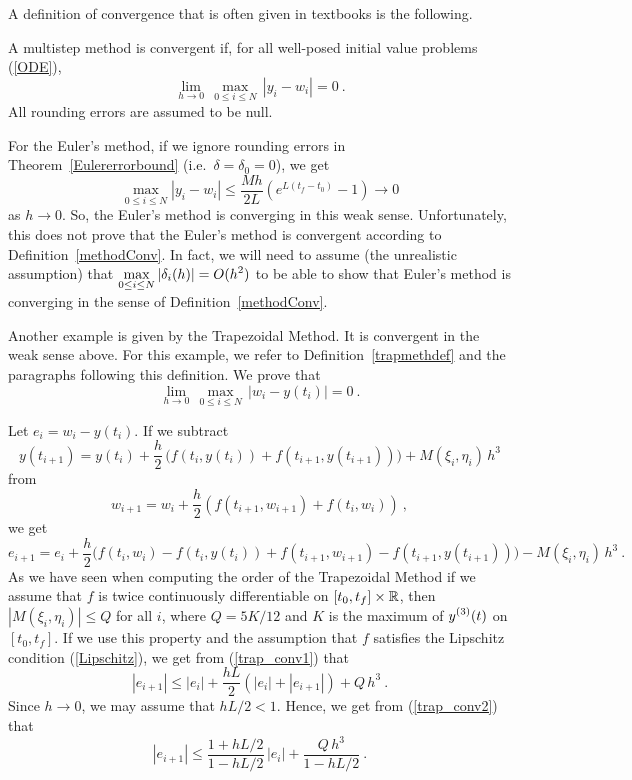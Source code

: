 \begin{rmk}
A definition of convergence that is often given in textbooks is the
following.  \label{AltDefConv}

A multistep method is convergent if, for all
well-posed initial value problems (\ref{ODE}),
\[
\lim_{h \rightarrow 0}\,\max_{0\leq i \leq N} \,|y_i - w_i| = 0 \ .
\]
All rounding errors are assumed to be null.

For the Euler's method, if we ignore rounding errors
in Theorem~\ref{Eulererrorbound} (i.e.\ $\delta=\delta_0=0$), we get
\[
\max_{0\leq i \leq N} |y_i - w_i| \leq
\frac{Mh}{2L}\left(e^{L(t_f -t_0)} -1 \right) \rightarrow 0
\]
as $h \rightarrow 0$.  So, the Euler's method is
converging in this weak sense.  Unfortunately, this does not
prove that the Euler's method is convergent according to
Definition~\ref{methodConv}.  In fact, we will need to assume
(the unrealistic assumption) that
$\displaystyle \max_{0\leq i \leq N} |\delta_i(h)| = O(h^2)$ to be
able to show that Euler's method is converging in the sense of
Definition~\ref{methodConv}.

Another example is given by the Trapezoidal Method.  It is convergent in
the weak sense above.  For this example, we refer to
Definition~\ref{trapmethdef} and the paragraphs following this
definition.  We prove that
\begin{equation} \label{trap_conv0}
\lim_{h\rightarrow 0}\,\max_{0\leq i \leq N}\,|w_i-y(t_i)| = 0 \ .
\end{equation}

Let $e_i = w_i - y(t_i)$.  If we subtract
\[
y(t_{i+1}) = y(t_i) + \frac{h}{2}\,\big(
f(t_i,y(t_i)) + f(t_{i+1},y(t_{i+1})) \big) + M(\xi_i,\eta_i)\,h^3
\]
from
\[
w_{i+1} = w_i + \frac{h}{2} \left(f(t_{i+1},w_{i+1}) +f(t_i,w_i) \right) \ ,
\]
we get
\begin{equation} \label{trap_conv1}
e_{i+1} = e_i + \frac{h}{2}\bigg( f(t_i,w_i) -
f(t_i,y(t_i)) + f(t_{i+1},w_{i+1}) - f(t_{i+1},y(t_{i+1})) \bigg)
- M(\xi_i,\eta_i)\,h^3 \ .
\end{equation}
As we have seen when computing the order of the Trapezoidal Method
if we assume that $f$ is twice continuously differentiable on
$[t_0,t_f]\times\mathbb{R}$, then $| M(\xi_i, \eta_i)| \leq Q$ for all $i$, where
$Q = 5K/12$ and $K$ is the maximum of $\displaystyle y^{(3)}(t)$ on $[t_0,t_f]$.
If we use this property and the assumption that $f$ satisfies the
Lipschitz condition (\ref{Lipschitz}), we get from (\ref{trap_conv1}) that
\begin{equation} \label{trap_conv2}
|e_{i+1}| \leq |e_i| + \frac{hL}{2}\left( |e_i| + |e_{i+1}| \right)
+ Q\,h^3 \ .
\end{equation}
Since $h\rightarrow 0$, we may assume that $hL/2 < 1$.  Hence, 
we get from (\ref{trap_conv2}) that
\begin{equation} \label{trap_conv3}
|e_{i+1}| \leq \frac{1 + hL/2}{1-hL/2}\,|e_i|
+\frac{Q\,h^3}{1-hL/2} \ .
\end{equation}


\end{rmk}
